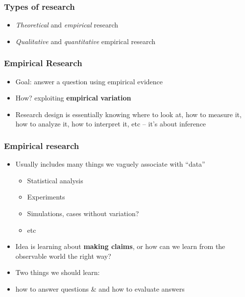 \documentclass[aspectratio=43]{beamer}
\begin{document}
\begin{frame}
\frametitle{Types of research}
\centering

\begin{itemize}
  \item \textit{Theoretical} and \textit{empirical} research
  \item \textit{Qualitative} and \textit{quantitative} empirical research
\end{itemize}

\end{frame}

\begin{frame}
\frametitle{Empirical Research}
\centering

\begin{itemize}
  \item Goal: answer a question using empirical evidence
  \item How? exploiting \textbf{empirical variation}
  \item Research design is essentially knowing where to look at, how to measure it, how to analyze it, how to interpret it, etc -- it's about inference
\end{itemize}

\end{frame}

\begin{frame}
\frametitle{Empirical research}
\centering

\begin{itemize}
  \item Usually includes many things we vaguely associate with ``data''
  \begin{itemize}
    \item Statistical analysis
    \item Experiments
    \item Simulations, cases without variation?
    \item etc
  \end{itemize}
  \item Idea is learning about \textbf{making claims}, or how can we learn from the observable world the right way?
  \item Two things we should learn:
  \item[] how to answer questions \& and how to evaluate answers
\end{itemize}

\end{frame}
\end{document}
